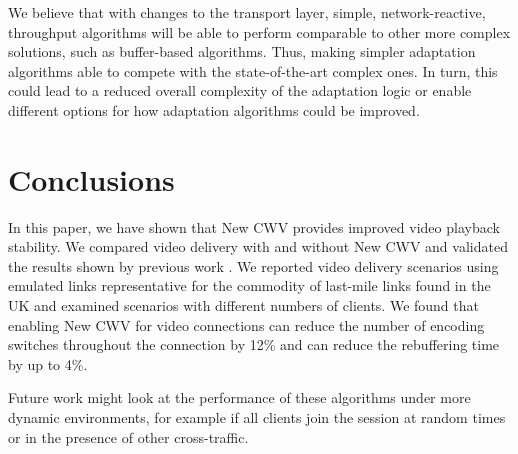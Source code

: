 \documentclass[10pt,sigconf,anonymous]{acmart}
\begin{document}
We believe that with changes to the transport layer, simple, network-reactive, throughput algorithms will be able to perform comparable to other more complex solutions, such as buffer-based algorithms. Thus, making simpler adaptation algorithms able to compete with the state-of-the-art complex ones. In turn, this could lead to a reduced overall complexity of the adaptation logic or enable different options for how adaptation algorithms could be improved.

\section{Conclusions}
\label{sec:conclusion}

In this paper, we have shown that New CWV provides improved video playback stability. We compared video delivery with and without New CWV and validated the results shown by previous work \cite{Nazir-2014-performance-evaluation-congestion-window-validation-dash-newcwv}. We reported video delivery scenarios using emulated links representative for the commodity of last-mile links found in the UK and examined scenarios with different numbers of clients. We found that enabling New CWV for video connections can reduce the number of encoding switches throughout the connection by 12\% and can reduce the rebuffering time by up to 4\%.

Future work might look at the performance of these algorithms under more dynamic environments, for example if all clients join the session at random times or in the presence of other cross-traffic. 





\ifpdf
  \ifdefined\pdftrailerid
    \pdftrailerid{}
  \fi
\fi


\end{document}
